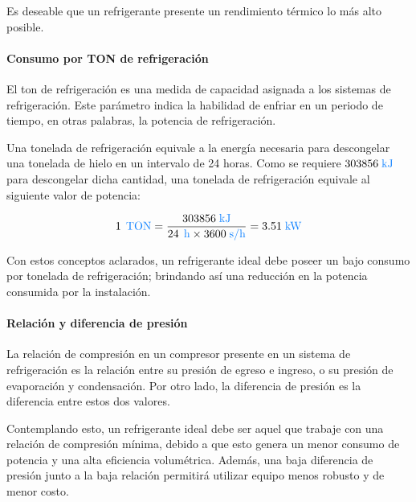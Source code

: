 	Es deseable que un refrigerante presente un rendimiento térmico lo más alto posible.

	\paragraph{Consumo por TON de refrigeración} El ton de refrigeración es una medida de capacidad asignada a los sistemas de refrigeración. Este parámetro indica la habilidad de enfriar en un periodo de tiempo, en otras palabras, la potencia de refrigeración.

	Una tonelada de refrigeración equivale a la energía necesaria para descongelar una tonelada de hielo en un intervalo de 24 horas. Como se requiere $303856\Un{kJ}$ para descongelar dicha cantidad, una tonelada de refrigeración equivale al siguiente valor de potencia:

	\begin{equation}\nonumber
		1 \, \Un{TON} = \dfrac{303856\Un{kJ}}{24 \, \Un{h} \times  3600 \Un{s/h}} = 3.51 \Un{kW} 
	\end{equation}

	Con estos conceptos aclarados, un refrigerante ideal debe poseer un bajo consumo por tonelada de refrigeración; brindando así una reducción en la potencia consumida por la instalación.

	\paragraph{Relación y diferencia de presión} La relación de compresión en un compresor presente en un sistema de refrigeración es la relación entre su presión de egreso e ingreso, o su presión de evaporación y condensación. Por otro lado, la diferencia de presión es la diferencia entre estos dos valores.
	
	Contemplando esto, un refrigerante ideal debe ser aquel que trabaje con una relación de compresión mínima, debido a que esto genera un menor consumo de potencia y una alta eficiencia volumétrica. Además, una baja diferencia de presión junto a la baja relación permitirá utilizar equipo menos robusto y de menor costo.

	


